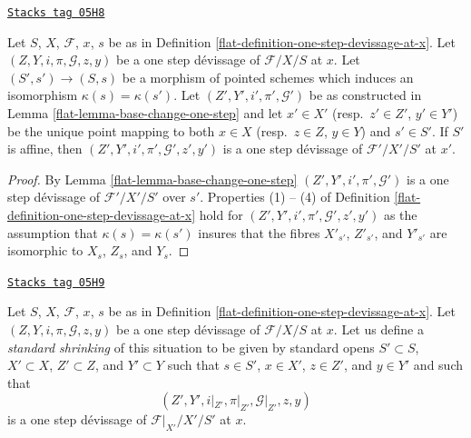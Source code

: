 \begin{lemma}
\label{flat-lemma-base-change-one-step-at-x}
\href{https://stacks.math.columbia.edu/tag/05H8}{\texttt{Stacks tag 05H8}}

Let $S$, $X$, $\mathcal{F}$, $x$, $s$ be as in
Definition \ref{flat-definition-one-step-devissage-at-x}.
Let $(Z, Y, i, \pi, \mathcal{G}, z, y)$ be a one step d\'evissage
of $\mathcal{F}/X/S$ at $x$.
Let $(S', s') \to (S, s)$ be a morphism of pointed schemes
which induces an isomorphism $\kappa(s) = \kappa(s')$.
Let $(Z', Y', i', \pi', \mathcal{G}')$ be as constructed in
Lemma \ref{flat-lemma-base-change-one-step}
and let $x' \in X'$ (resp.\ $z' \in Z'$, $y' \in Y'$) be the
unique point mapping to both $x \in X$ (resp.\ $z \in Z$, $y \in Y$)
and $s' \in S'$.
If $S'$ is affine, then $(Z', Y', i', \pi', \mathcal{G}', z', y')$
is a one step d\'evissage of $\mathcal{F}'/X'/S'$ at $x'$.
\end{lemma}

\begin{proof}

By
Lemma \ref{flat-lemma-base-change-one-step}
$(Z', Y', i', \pi', \mathcal{G}')$ is a one step d\'evissage of
$\mathcal{F}'/X'/S'$ over $s'$. Properties (1) -- (4) of
Definition \ref{flat-definition-one-step-devissage-at-x}
hold for $(Z', Y', i', \pi', \mathcal{G}', z', y')$
as the assumption that $\kappa(s) = \kappa(s')$ insures that the fibres
$X'_{s'}$, $Z'_{s'}$, and $Y'_{s'}$ are isomorphic to
$X_s$, $Z_s$, and $Y_s$.
\end{proof}

\begin{definition}[Shrink]
\label{flat-definition-shrink}
\href{https://stacks.math.columbia.edu/tag/05H9}{\texttt{Stacks tag 05H9}}

Let $S$, $X$, $\mathcal{F}$, $x$, $s$ be as in
Definition \ref{flat-definition-one-step-devissage-at-x}.
Let $(Z, Y, i, \pi, \mathcal{G}, z, y)$ be a one step d\'evissage
of $\mathcal{F}/X/S$ at $x$. Let us define a
{\it standard shrinking} of this situation to be
given by standard opens $S' \subset S$, $X' \subset X$, $Z' \subset Z$,
and $Y' \subset Y$ such that $s \in S'$, $x \in X'$, $z \in Z'$, and
$y \in Y'$ and such that
$$
(Z', Y', i|_{Z'}, \pi|_{Z'}, \mathcal{G}|_{Z'}, z, y)
$$
is a one step d\'evissage of $\mathcal{F}|_{X'}/X'/S'$ at $x$.
\end{definition}

